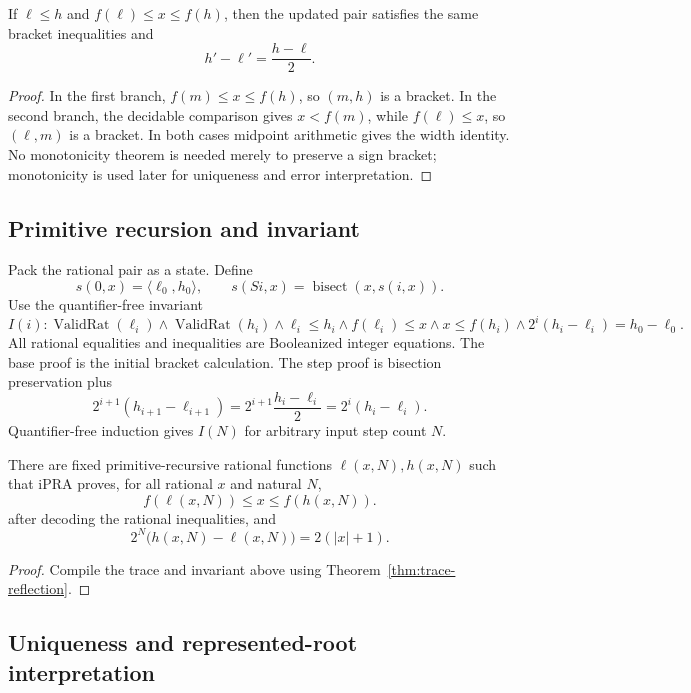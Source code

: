 \begin{lemma}
If \(\ell\le h\) and \(f(\ell)\le x\le f(h)\), then the updated pair satisfies the same bracket
inequalities and
\[
 h'-\ell'=\frac{h-\ell}{2}.
\]
\end{lemma}
\begin{proof}
In the first branch, \(f(m)\le x\le f(h)\), so \((m,h)\) is a bracket.  In the second branch, the decidable
comparison gives \(x<f(m)\), while \(f(\ell)\le x\), so \((\ell,m)\) is a bracket.  In both cases midpoint
arithmetic gives the width identity.  No monotonicity theorem is needed merely to preserve a sign bracket;
monotonicity is used later for uniqueness and error interpretation.
\end{proof}

\subsection{Primitive recursion and invariant}

Pack the rational pair as a state.  Define
\[
  s(0,x)=\langle\ell_0,h_0\rangle,
  \qquad
  s(Si,x)=\operatorname{bisect}(x,s(i,x)).
\]
Use the quantifier-free invariant
\[
 I(i):
 \operatorname{ValidRat}(\ell_i)\wedge
 \operatorname{ValidRat}(h_i)\wedge
 \ell_i\le h_i\wedge
 f(\ell_i)\le x\wedge x\le f(h_i)
 \wedge 2^i(h_i-\ell_i)=h_0-\ell_0.
\]
All rational equalities and inequalities are Booleanized integer equations.  The base proof is the initial
bracket calculation.  The step proof is bisection preservation plus
\[
  2^{i+1}(h_{i+1}-\ell_{i+1})
  =2^{i+1}\frac{h_i-\ell_i}{2}
  =2^i(h_i-\ell_i).
\]
Quantifier-free induction gives \(I(N)\) for arbitrary input step count \(N\).

\begin{theorem}
There are fixed primitive-recursive rational functions \(\ell(x,N),h(x,N)\) such that iPRA proves, for
all rational \(x\) and natural \(N\),
\[
 f(\ell(x,N))\le x\le f(h(x,N)).
\]
after decoding the rational inequalities, and
\[
 2^N\bigl(h(x,N)-\ell(x,N)\bigr)=2(|x|+1).
\]
\end{theorem}
\begin{proof}
Compile the trace and invariant above using Theorem~\ref{thm:trace-reflection}.
\end{proof}

\subsection{Uniqueness and represented-root interpretation}

